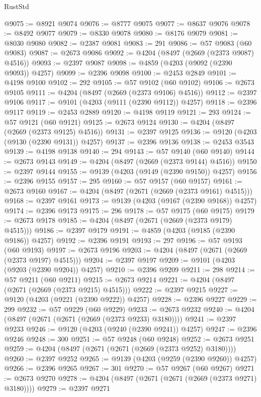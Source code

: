 \begin{lexlean}{RustStd}
\begin{coremodule}
@9075 := @8921 @9074
@9076 := @8777 @9075
@9077 := @8637 @9076
@9078 := @8492 @9077
@9079 := @8330 @9078
@9080 := @8176 @9079
@9081 := @8030 @9080
@9082 := @2387 @9081
@9083 := 291
@9086 := @57 @9083 (@60 @9083)
@9087 := @2673 @9086
@9092 := @4204 (@8497 (@2669 (@2373 @9087) @4516))
@9093 := @2397 @9087
@9098 := @4859 (@4203 (@9092 (@2390 @9093)) @4257)
@9099 := @2396 @9098
@9100 := @2453 @2849
@9101 := @4198 @9100
@9102 := 292
@9105 := @57 @9102 (@60 @9102)
@9106 := @2673 @9105
@9111 := @4204 (@8497 (@2669 (@2373 @9106) @4516))
@9112 := @2397 @9106
@9117 := @9101 (@4203 (@9111 (@2390 @9112)) @4257)
@9118 := @2396 @9117
@9119 := @2453 @2889
@9120 := @4198 @9119
@9121 := 293
@9124 := @57 @9121 (@60 @9121)
@9125 := @2673 @9124
@9130 := @4204 (@8497 (@2669 (@2373 @9125) @4516))
@9131 := @2397 @9125
@9136 := @9120 (@4203 (@9130 (@2390 @9131)) @4257)
@9137 := @2396 @9136
@9138 := @2453 @3543
@9139 := @4198 @9138
@9140 := 294
@9143 := @57 @9140 (@60 @9140)
@9144 := @2673 @9143
@9149 := @4204 (@8497 (@2669 (@2373 @9144) @4516))
@9150 := @2397 @9144
@9155 := @9139 (@4203 (@9149 (@2390 @9150)) @4257)
@9156 := @2396 @9155
@9157 := 295
@9160 := @57 @9157 (@60 @9157)
@9161 := @2673 @9160
@9167 := @4204 (@8497 (@2671 (@2669 (@2373 @9161) @4515)))
@9168 := @2397 @9161
@9173 := @9139 (@4203 (@9167 (@2390 @9168)) @4257)
@9174 := @2396 @9173
@9175 := 296
@9178 := @57 @9175 (@60 @9175)
@9179 := @2673 @9178
@9185 := @4204 (@8497 (@2671 (@2669 (@2373 @9179) @4515)))
@9186 := @2397 @9179
@9191 := @4859 (@4203 (@9185 (@2390 @9186)) @4257)
@9192 := @2396 @9191
@9193 := 297
@9196 := @57 @9193 (@60 @9193)
@9197 := @2673 @9196
@9203 := @4204 (@8497 (@2671 (@2669 (@2373 @9197) @4515)))
@9204 := @2397 @9197
@9209 := @9101 (@4203 (@9203 (@2390 @9204)) @4257)
@9210 := @2396 @9209
@9211 := 298
@9214 := @57 @9211 (@60 @9211)
@9215 := @2673 @9214
@9221 := @4204 (@8497 (@2671 (@2669 (@2373 @9215) @4515)))
@9222 := @2397 @9215
@9227 := @9120 (@4203 (@9221 (@2390 @9222)) @4257)
@9228 := @2396 @9227
@9229 := 299
@9232 := @57 @9229 (@60 @9229)
@9233 := @2673 @9232
@9240 := @4204 (@8497 (@2671 (@2671 (@2669 (@2373 @9233) @3180))))
@9241 := @2397 @9233
@9246 := @9120 (@4203 (@9240 (@2390 @9241)) @4257)
@9247 := @2396 @9246
@9248 := 300
@9251 := @57 @9248 (@60 @9248)
@9252 := @2673 @9251
@9259 := @4204 (@8497 (@2671 (@2671 (@2669 (@2373 @9252) @3180))))
@9260 := @2397 @9252
@9265 := @9139 (@4203 (@9259 (@2390 @9260)) @4257)
@9266 := @2396 @9265
@9267 := 301
@9270 := @57 @9267 (@60 @9267)
@9271 := @2673 @9270
@9278 := @4204 (@8497 (@2671 (@2671 (@2669 (@2373 @9271) @3180))))
@9279 := @2397 @9271

\end{coremodule}
\end{lexlean}
